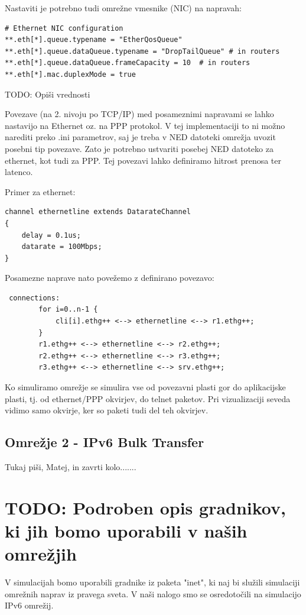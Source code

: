 \documentclass[11pt,a4paper,slovene]{myarticle}
\begin{document}
Nastaviti je potrebno tudi omrežne vmesnike (NIC) na napravah:
\begin{lstlisting}
# Ethernet NIC configuration
**.eth[*].queue.typename = "EtherQosQueue"
**.eth[*].queue.dataQueue.typename = "DropTailQueue" # in routers
**.eth[*].queue.dataQueue.frameCapacity = 10  # in routers
**.eth[*].mac.duplexMode = true
\end{lstlisting}

TODO: Opiši vrednosti

Povezave (na 2. nivoju po TCP/IP) med posameznimi napravami se lahko nastavijo na Ethernet oz. na PPP protokol.
V tej implementaciji to ni možno narediti preko .ini parametrov, saj je treba v NED datoteki omrežja uvozit posebni tip povezave. Zato je potrebno ustvariti posebej NED datoteko za ethernet, kot tudi za PPP.
Tej povezavi lahko definiramo hitrost prenosa ter latenco.

Primer za ethernet:
\begin{lstlisting}
channel ethernetline extends DatarateChannel
{
    delay = 0.1us;
    datarate = 100Mbps;
}
\end{lstlisting}

Posamezne naprave nato povežemo z definirano povezavo:
\begin{lstlisting}
 connections:
        for i=0..n-1 {
            cli[i].ethg++ <--> ethernetline <--> r1.ethg++;
        }
        r1.ethg++ <--> ethernetline <--> r2.ethg++;
        r2.ethg++ <--> ethernetline <--> r3.ethg++;
        r3.ethg++ <--> ethernetline <--> srv.ethg++;
\end{lstlisting}

Ko simuliramo omrežje se simulira vse od povezavni plasti gor do aplikacijske plasti, tj. od ethernet/PPP okvirjev, do telnet paketov. Pri vizualizaciji seveda vidimo samo okvirje, ker so paketi tudi del teh okvirjev.




\subsection{Omrežje 2 - IPv6 Bulk Transfer}
Tukaj piši, Matej, in zavrti kolo.......


\section{TODO: Podroben opis gradnikov, ki jih bomo uporabili v naših omrežjih}
V simulacijah bomo uporabili gradnike iz paketa "inet", ki naj bi služili simulaciji omrežnih naprav iz pravega sveta. V naši nalogo smo se osredotočili na simulacijo IPv6 omrežij.
\end{document}
